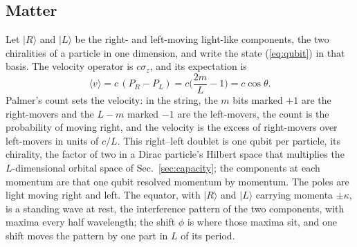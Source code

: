 \documentclass[aps,prd,twocolumn,superscriptaddress,nofootinbib]{revtex4-2}
\begin{document}
\subsection{Matter}
\label{sec:matter}

Let $|R\rangle$ and $|L\rangle$ be the right- and left-moving light-like components, the two chiralities of a particle in one dimension, and write the state (\ref{eq:qubit}) in that basis. The velocity operator is $c\sigma_z$, and its expectation is
\begin{equation}
\langle v\rangle = c\,(P_R - P_L) = c\Big(\frac{2m}{L} - 1\Big) = c\cos\theta .
\label{eq:velocity}
\end{equation}
Palmer's count sets the velocity: in the string, the $m$ bits marked $+1$ are the right-movers and the $L-m$ marked $-1$ are the left-movers, the count is the probability of moving right, and the velocity is the excess of right-movers over left-movers in units of $c/L$. This right--left doublet is one qubit per particle, its chirality, the factor of two in a Dirac particle's Hilbert space that multiplies the $L$-dimensional orbital space of Sec.~\ref{sec:capacity}; the components at each momentum are that one qubit resolved momentum by momentum. The poles are light moving right and left. The equator, with $|R\rangle$ and $|L\rangle$ carrying momenta $\pm\kappa$, is a standing wave at rest, the interference pattern of the two components, with maxima every half wavelength; the shift $\phi$ is where those maxima sit, and one shift moves the pattern by one part in $L$ of its period.
\end{document}
